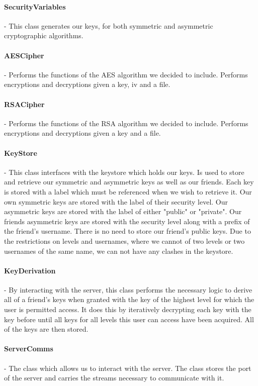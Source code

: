 \documentclass[12pt, titlepage]{article}
\begin{document}
\paragraph*{SecurityVariables} - This class generates our keys, for both symmetric and asymmetric cryptographic algorithms.
\paragraph*{AESCipher} - Performs the functions of the AES algorithm we decided to include. Performs encryptions and decryptions given a key, iv and a file.
\paragraph*{RSACipher} - Performs the functions of the RSA algorithm we decided to include. Performs encryptions and decryptions given a key and a file.
\paragraph*{KeyStore} - This class interfaces with the keystore which holds our keys. Is used to store and retrieve our symmetric and asymmetric keys as well as our friends. Each key is stored with a label which must be referenced when we wish to retrieve it. Our own symmetric keys are stored with the label of their security level. Our asymmetric keys are stored with the label of either "public" or "private". Our friends asymmetric keys are stored with the security level along with a prefix of the friend's username. There is no need to store our friend's public keys. Due to the restrictions on levels and usernames, where we cannot of two levels or two usernames of the same name, we can not have any clashes in the keystore.
\paragraph*{KeyDerivation} - By interacting with the server, this class performs the necessary logic to derive all of a friend's keys when granted with the key of the highest level for which the user is permitted access. It does this by iteratively decrypting each key with the key before until all keys for all levels this user can access have been acquired. All of the keys are then stored.
\paragraph*{ServerComms} - The class which allows us to interact with the server. The class stores the port of the server and carries the streams necessary to communicate with it.
\end{document}
